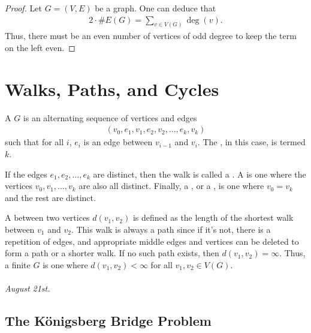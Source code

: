 \begin{proof}
    Let $G = (V,E)$ be a graph. One can deduce that
    \begin{align}
        2 \cdot \# E(G) = \sum_{v \in V(G)} \deg(v).
    \end{align}
    Thus, there must be an even number of vertices of odd degree to keep the term on the left even.
\end{proof}


\section{Walks, Paths, and Cycles}

\begin{definition}
    A  $G$ is an alternating sequence of vertices and edges 
    \begin{align}
        (v_{0},e_{1},v_{1},e_{2},v_{2},\ldots,e_{k},v_{k})
    \end{align}
    such that for all $i$, $e_{i}$ is an edge between $v_{i-1}$ and $v_{i}$. The , in this case, is termed $k$.
\end{definition}


\begin{definition}
    If the edges $e_{1},e_{2},\ldots,e_{k}$ are distinct, then the walk is called a . A  is one where the vertices $v_{0},v_{1},\ldots,v_{k}$ are also all distinct. Finally, a , or a , is one where $v_{0} = v_{k}$ and the rest are distinct.
\end{definition}

A  between two vertices $d(v_{1},v_{2})$ is defined as the length of the shortest walk between $v_{1}$ and $v_{2}$. This walk is always a path since if it's not, there is a repetition of edges, and appropriate middle edges and vertices can be deleted to form a path or a shorter walk. If no such path exists, then $d(v_{1},v_{2}) = \infty$. Thus, a finite  $G$ is one where $d(v_{1},v_{2}) < \infty$ for all $v_{1},v_{2} \in V(G)$.\\ \\
\textit{August 21st.}

\subsection{The K\"onigsberg Bridge Problem}

